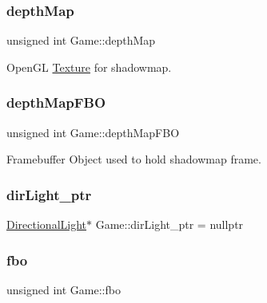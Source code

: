 \mbox{\label{class_game_a61853261d678bcfe2638deba1e58fd18}} 
\subsubsection{\texorpdfstring{depthMap}{depthMap}}
{\footnotesize\ttfamily unsigned int Game\+::depth\+Map\hspace{0.3cm}{\ttfamily [protected]}}



Open\+GL \mbox{\hyperlink{class_texture}{Texture}} for shadowmap. 

\mbox{\label{class_game_aab4586c4a7c0240977381b22808ebfa6}} 
\subsubsection{\texorpdfstring{depthMapFBO}{depthMapFBO}}
{\footnotesize\ttfamily unsigned int Game\+::depth\+Map\+F\+BO\hspace{0.3cm}{\ttfamily [protected]}}



Framebuffer Object used to hold shadowmap frame. 

\mbox{\label{class_game_abf59c36fc2002f081db238c0c59d281c}} 
\subsubsection{\texorpdfstring{dirLight\_ptr}{dirLight\_ptr}}
{\footnotesize\ttfamily \mbox{\hyperlink{class_directional_light}{Directional\+Light}}$\ast$ Game\+::dir\+Light\+\_\+ptr = nullptr}

\mbox{\label{class_game_a64cdbfe0d81d60426bb6523459d7b52c}} 
\subsubsection{\texorpdfstring{fbo}{fbo}}
{\footnotesize\ttfamily unsigned int Game\+::fbo\hspace{0.3cm}{\ttfamily [protected]}}




